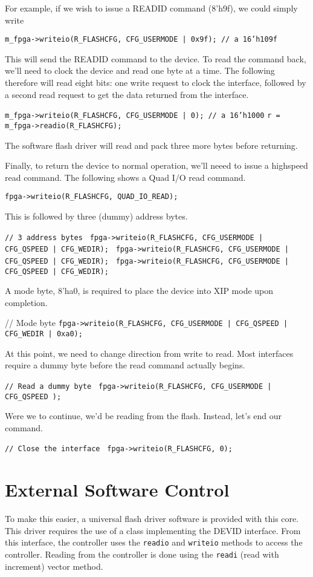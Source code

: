 \documentclass{gqtekspec}
\begin{document}
For example, if we wish to issue a READID command (8'h9f), we could simply
write

{\tt m\_fpga->writeio(R\_FLASHCFG, CFG\_USERMODE | 0x9f); // a 16'h109f}

This will send the READID command to the device.  To read the command back,
we'll need to clock the device and read one byte at a time.  The following
therefore will read eight bits: one write request to clock the interface,
followed by a second read request to get the data returned from the interface.

{\tt m\_fpga->writeio(R\_FLASHCFG, CFG\_USERMODE | 0); // a 16'h1000}
{\tt r = m\_fpga->readio(R\_FLASHCFG);}

The software flash driver will read and pack three more bytes before returning.

Finally, to return the device to normal operation, we'll neeed to issue a
highspeed read command.  The following shows a Quad I/O read command.

{\tt fpga->writeio(R\_FLASHCFG, QUAD\_IO\_READ); }

This is followed  by three (dummy) address bytes.

{\tt // 3 address bytes }
{\tt fpga->writeio(R\_FLASHCFG, CFG\_USERMODE | CFG\_QSPEED | CFG\_WEDIR); }
{\tt fpga->writeio(R\_FLASHCFG, CFG\_USERMODE | CFG\_QSPEED | CFG\_WEDIR); }
{\tt fpga->writeio(R\_FLASHCFG, CFG\_USERMODE | CFG\_QSPEED | CFG\_WEDIR); }

A mode byte, 8'ha0, is required to place the device into XIP mode upon
completion.

// Mode byte
{\tt fpga->writeio(R\_FLASHCFG, CFG\_USERMODE | CFG\_QSPEED | CFG\_WEDIR | 0xa0);}

At this point, we need to change direction from write to read.
Most interfaces require a dummy byte before the read command actually begins.

{\tt // Read a dummy byte }
{\tt fpga->writeio(R\_FLASHCFG, CFG\_USERMODE | CFG\_QSPEED ); }

Were we to continue, we'd be reading from the flash.  Instead, let's end
our command.

{\tt // Close the interface }
{\tt fpga->writeio(R\_FLASHCFG, 0); }

\section{External Software Control}

To make this easier, a universal flash driver software is provided with this
core.  This driver requires the use of a class implementing the DEVID
interface.  From this interface, the controller uses the {\tt readio}
and {\tt writeio} methods to access the controller.  Reading from the
controller is done using the {\tt readi} (read with increment) vector method.
\end{document}

